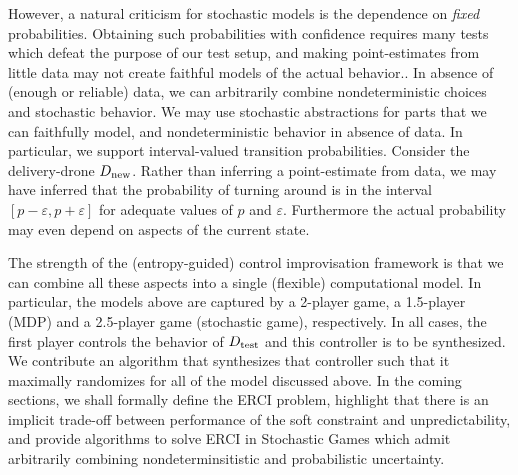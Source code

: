 
 However, a natural criticism for stochastic
models is the dependence on \emph{fixed} probabilities. 
Obtaining such probabilities with confidence requires many tests which defeat the purpose of our test setup, and making point-estimates from little data may not create faithful models of the actual behavior..
  In absence of (enough or reliable) data, we can arbitrarily combine
nondeterministic choices and stochastic behavior. We may use stochastic abstractions for parts that we can faithfully model, and nondeterministic behavior in absence of data.
In particular, we
support interval-valued transition probabilities.  Consider the
delivery-drone ${D_{\text{new}}}$. Rather than inferring a point-estimate
from data, we may have inferred that the probability of turning around
is in the interval $[p - \varepsilon, p + \varepsilon]$ for adequate
values of $p$ and $\varepsilon$.  Furthermore the actual probability
may even depend on aspects of the current state.

The strength of the (entropy-guided) control improvisation framework
is that we can combine all these aspects into a single (flexible)
computational model. 
In particular, the models above are captured by a 2-player game, a 1.5-player (MDP) and a 2.5-player game (stochastic game), respectively.
In all cases, the first player controls the behavior of ${D_{\text{test}}}$ and this controller is to be synthesized. 
We contribute an algorithm that synthesizes that controller such that
it  maximally randomizes for all of the model discussed above. In the
coming sections, we shall formally define the ERCI problem, highlight
that there is an implicit trade-off between performance of the soft
constraint and unpredictability, and provide algorithms to solve ERCI
in Stochastic Games which admit arbitrarily combining nondeterminsitistic and
probabilistic uncertainty.



